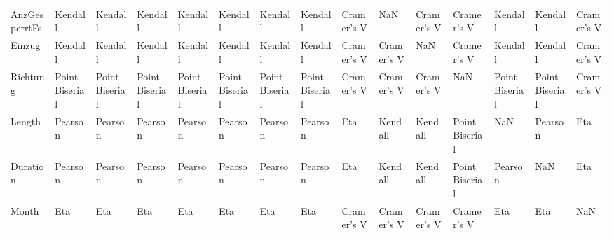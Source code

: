 \begin{tabular}{lllllllllllllll}
AnzGesperrtFs &         Kendall &         Kendall &         Kendall &         Kendall &         Kendall &         Kendall &         Kendall &  Cramer's V &           NaN &  Cramer's V &      Cramer's V &         Kendall &         Kendall &  Cramer's V \\
Einzug        &         Kendall &         Kendall &         Kendall &         Kendall &         Kendall &         Kendall &         Kendall &  Cramer's V &    Cramer's V &         NaN &      Cramer's V &         Kendall &         Kendall &  Cramer's V \\
Richtung      &  Point Biserial &  Point Biserial &  Point Biserial &  Point Biserial &  Point Biserial &  Point Biserial &  Point Biserial &  Cramer's V &    Cramer's V &  Cramer's V &             NaN &  Point Biserial &  Point Biserial &  Cramer's V \\
Length        &         Pearson &         Pearson &         Pearson &         Pearson &         Pearson &         Pearson &         Pearson &         Eta &       Kendall &     Kendall &  Point Biserial &             NaN &         Pearson &         Eta \\
Duration      &         Pearson &         Pearson &         Pearson &         Pearson &         Pearson &         Pearson &         Pearson &         Eta &       Kendall &     Kendall &  Point Biserial &         Pearson &             NaN &         Eta \\
Month         &             Eta &             Eta &             Eta &             Eta &             Eta &             Eta &             Eta &  Cramer's V &    Cramer's V &  Cramer's V &      Cramer's V &             Eta &             Eta &         NaN \\
\bottomrule
\end{tabular}
